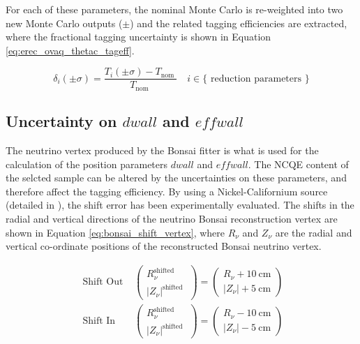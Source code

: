 For each of these parameters, the nominal Monte Carlo is re-weighted into two new Monte Carlo outputs ($\pm$) and the related tagging efficiencies are extracted, where the fractional tagging uncertainty is shown in Equation \ref{eq:erec_ovaq_thetac_tageff}. 

\begin{equation}
    \delta_i(\pm \sigma)=\frac{T_i(\pm \sigma)-T_{\text {nom }}}{T_{\text {nom }}} \quad i \in\{\text { reduction parameters }\}
\label{eq:erec_ovaq_thetac_tageff}
\end{equation}


\subsection{Uncertainty on $dwall$ and $effwall$}

The neutrino vertex produced by the Bonsai fitter is what is used for the calculation of the position parameters $dwall$ and $effwall$. The NCQE content of the selcted sample can be altered by the uncertainties on these parameters, and therefore affect the tagging efficiency. By using a Nickel-Californium source (detailed in \cite{solar_nu_measurements}), the shift error has been experimentally evaluated. The shifts in the radial and vertical directions of the neutrino Bonsai reconstruction vertex are shown in Equation \ref{eq:bonsai_shift_vertex}, where $R_{\nu}$ and $Z_{\nu}$ are the radial and vertical co-ordinate positions of the reconstructed Bonsai neutrino vertex.

\begin{equation}
    \begin{array}{ll}
        \text { Shift Out } & \left(\begin{array}{c}
        R_\nu^{\text {shifted }} \\
        \left|Z_\nu\right|^{\text {shifted }}
        \end{array}\right)=\left(\begin{array}{l}
        R_\nu+10 \mathrm{~cm} \\
        \left|Z_\nu\right|+5 \mathrm{~cm}
        \end{array}\right) \\
        \text { Shift In } & \left(\begin{array}{c}
        R_\nu^{\text {shifted }} \\
        \left|Z_\nu\right|^{\text {shifted }}
        \end{array}\right)=\left(\begin{array}{c}
        R_\nu-10 \mathrm{~cm} \\
        \left|Z_\nu\right|-5 \mathrm{~cm}
        \end{array}\right)
        \end{array}
\label{eq:bonsai_shift_vertex}
\end{equation}

